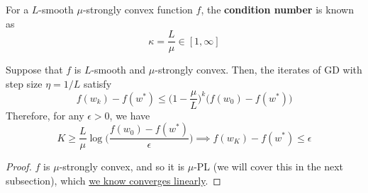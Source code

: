 	\begin{definition}
	  \label{def:condition-number}
		For a $L$-smooth $\mu$-strongly convex function $f$, the \textbf{condition number} is known as 
		\begin{equation}
			\kappa = \frac{L}{\mu} \in [1, \infty]
		\end{equation}
	\end{definition} 

	\begin{theorem}
	  \label{thm:linear-convergence-of-objective-value-on-gd}
	  Suppose that $f$ is $L$-smooth and $\mu$-strongly convex. Then, the iterates of GD with step size $\eta = 1/L$ satisfy 
		\begin{equation}
			f(w_k) - f(w^\ast) \leq \bigg( 1 - \frac{\mu}{L} \bigg)^k \big( f(w_0) - f(w^\ast) \big) 
		\end{equation}
		Therefore, for any $\epsilon > 0$, we have 
		\begin{equation}
			K \geq \frac{L}{\mu} \log \bigg( \frac{f(w_0) - f(w^\ast)}{\epsilon} \bigg) \implies f(w_K) - f(w^\ast) \leq \epsilon
		\end{equation}
	\end{theorem}
	\begin{proof}
		$f$ is $\mu$-strongly convex, and so it is $\mu$-PL (we will cover this in the next subsection), which \hyperref[thm:linear_convergence_pl]{we know converges linearly}. 
	\end{proof}

